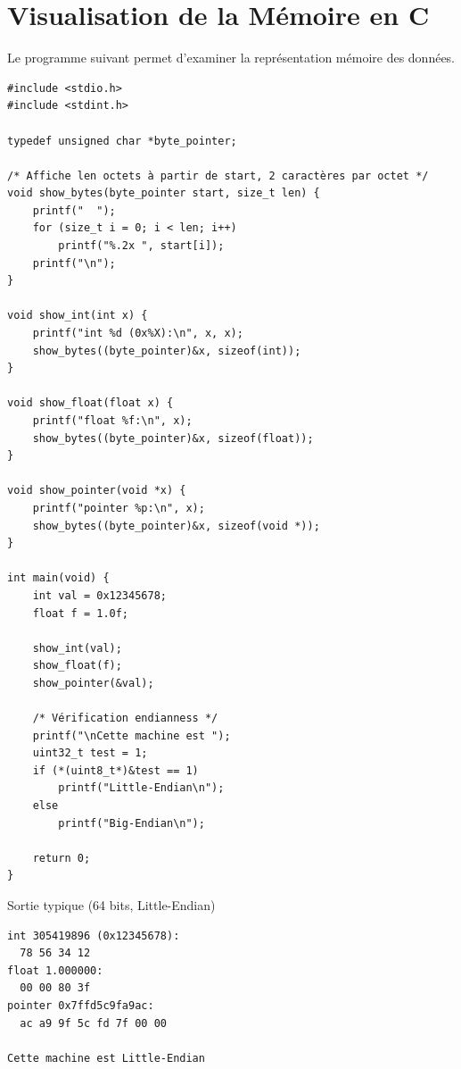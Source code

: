\documentclass[10pt,a4paper]{article}
\begin{document}
\section{Visualisation de la Mémoire en C}

Le programme suivant permet d'examiner la représentation mémoire des données.

\begin{lstlisting}[caption={Programme complet de visualisation mémoire}]
#include <stdio.h>
#include <stdint.h>

typedef unsigned char *byte_pointer;

/* Affiche len octets à partir de start, 2 caractères par octet */
void show_bytes(byte_pointer start, size_t len) {
    printf("  ");
    for (size_t i = 0; i < len; i++)
        printf("%.2x ", start[i]);
    printf("\n");
}

void show_int(int x) {
    printf("int %d (0x%X):\n", x, x);
    show_bytes((byte_pointer)&x, sizeof(int));
}

void show_float(float x) {
    printf("float %f:\n", x);
    show_bytes((byte_pointer)&x, sizeof(float));
}

void show_pointer(void *x) {
    printf("pointer %p:\n", x);
    show_bytes((byte_pointer)&x, sizeof(void *));
}

int main(void) {
    int val = 0x12345678;
    float f = 1.0f;
    
    show_int(val);
    show_float(f);
    show_pointer(&val);
    
    /* Vérification endianness */
    printf("\nCette machine est ");
    uint32_t test = 1;
    if (*(uint8_t*)&test == 1)
        printf("Little-Endian\n");
    else
        printf("Big-Endian\n");
    
    return 0;
}
\end{lstlisting}

\begin{examplebox}{Sortie typique (64 bits, Little-Endian)}
\begin{verbatim}
int 305419896 (0x12345678):
  78 56 34 12 
float 1.000000:
  00 00 80 3f 
pointer 0x7ffd5c9fa9ac:
  ac a9 9f 5c fd 7f 00 00 

Cette machine est Little-Endian
\end{verbatim}
\end{examplebox}

\end{document}
